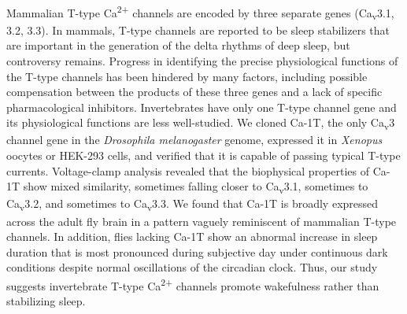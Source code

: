 Mammalian T-type Ca\textsuperscript{2+} channels are encoded by three separate genes (Ca\textsubscript{v}3.1, 3.2, 3.3).
In mammals, T-type channels are reported to be sleep stabilizers that are important in the generation of the delta rhythms of deep sleep, but controversy remains.
Progress in identifying the precise physiological functions of the T-type channels has been hindered by many factors, including possible compensation between the products of these three genes and a lack of specific pharmacological inhibitors.
Invertebrates have only one T-type channel gene and its physiological functions are less well-studied.
We cloned Ca-\alpha1T, the only Ca\textsubscript{v}3 channel gene in the \emph{Drosophila melanogaster} genome, expressed it in \emph{Xenopus} oocytes or HEK-293 cells, and verified that it is capable of passing typical T-type currents.
Voltage-clamp analysis revealed that the biophysical properties of Ca-\alpha1T show mixed similarity, sometimes falling closer to Ca\textsubscript{v}3.1, sometimes to Ca\textsubscript{v}3.2, and sometimes to Ca\textsubscript{v}3.3.
We found that Ca-\alpha1T is broadly expressed across the adult fly brain in a pattern vaguely reminiscent of mammalian T-type channels.
In addition, flies lacking Ca-\alpha1T show an abnormal increase in sleep duration that is most pronounced during subjective day under continuous dark conditions despite normal oscillations of the circadian clock.
Thus, our study suggests invertebrate T-type Ca\textsuperscript{2+} channels promote wakefulness rather than stabilizing sleep.
